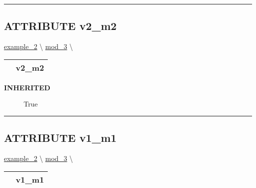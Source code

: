 \rule{\linewidth}{0.5pt}
\subsection*{\textsf{\colorbox{headtoc}{\color{white} ATTRIBUTE}
v2\_m2}}

\hypertarget{ecldoc:intest.inintest.example_2.mod_2.v2_m2}{}
\hspace{0pt} \hyperlink{ecldoc:intest.inintest.example_2}{example_2} \textbackslash 
\hspace{0pt} \hyperlink{ecldoc:intest.inintest.example_2.mod_3}{mod_3} \textbackslash 

{\renewcommand{\arraystretch}{1.5}
\begin{tabularx}{\textwidth}{|>{\raggedright\arraybackslash}l|X|}
\hline
\hspace{0pt}\mytexttt{\color{red} } & \textbf{v2\_m2} \\
\hline
\end{tabularx}
}

\par

\par
\begin{description}
\item [\colorbox{tagtype}{\color{white} \textbf{\textsf{INHERITED}}}] \textbf{\underline{}} True
\end{description}

\rule{\linewidth}{0.5pt}
\subsection*{\textsf{\colorbox{headtoc}{\color{white} ATTRIBUTE}
v1\_m1}}

\hypertarget{ecldoc:intest.inintest.example_2.mod_3.v1_m1}{}
\hspace{0pt} \hyperlink{ecldoc:intest.inintest.example_2}{example_2} \textbackslash 
\hspace{0pt} \hyperlink{ecldoc:intest.inintest.example_2.mod_3}{mod_3} \textbackslash 

{\renewcommand{\arraystretch}{1.5}
\begin{tabularx}{\textwidth}{|>{\raggedright\arraybackslash}l|X|}
\hline
\hspace{0pt}\mytexttt{\color{red} } & \textbf{v1\_m1} \\
\hline
\end{tabularx}
}

\par

